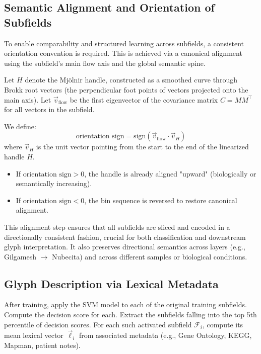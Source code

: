 \documentclass{article}
\begin{document}
\subsection{Semantic Alignment and Orientation of Subfields}

To enable comparability and structured learning across subfields, a consistent orientation convention is required. This is achieved via a canonical alignment using the subfield’s main flow axis and the global semantic spine.

Let $H$ denote the Mj\"olnir handle, constructed as a smoothed curve through Brokk root vectors (the perpendicular foot points of vectors projected onto the main axis). Let $\vec{v}_{\text{flow}}$ be the first eigenvector of the covariance matrix $C = M M^\top$ for all vectors in the subfield.

We define:
\[
\text{orientation sign} = \mathrm{sign}\left( \vec{v}_{\text{flow}} \cdot \vec{v}_{H} \right)
\]
where $\vec{v}_H$ is the unit vector pointing from the start to the end of the linearized handle $H$.

\begin{itemize}
  \item If $\text{orientation sign} > 0$, the handle is already aligned "upward" (biologically or semantically increasing).
  \item If $\text{orientation sign} < 0$, the bin sequence is reversed to restore canonical alignment.
\end{itemize}

This alignment step ensures that all subfields are sliced and encoded in a directionally consistent fashion, crucial for both classification and downstream glyph interpretation. It also preserves directional semantics across layers (e.g., Gilgamesh $\rightarrow$ Nubecita) and across different samples or biological conditions.

\subsection{Glyph Description via Lexical Metadata}

After training, apply the SVM model to each of the original training subfields. Compute the decision score for each. Extract the subfields falling into the top 5th percentile of decision scores. For each such activated subfield $\mathcal{F}_i$, compute its mean lexical vector $\vec{\ell}_i$ from associated metadata (e.g., Gene Ontology, KEGG, Mapman, patient notes).
\end{document}
